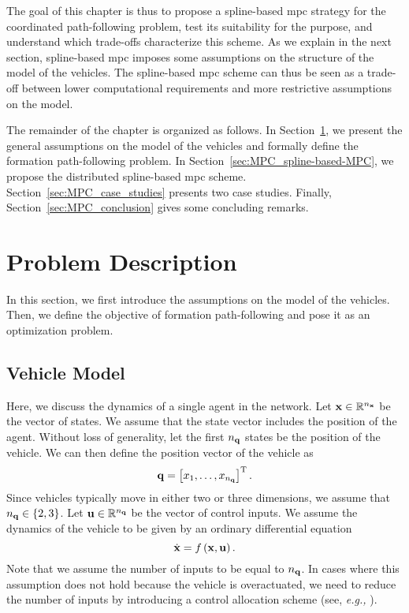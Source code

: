The goal of this chapter is thus to propose a spline-based \gls{mpc} strategy for the coordinated path-following problem, test its suitability for the purpose, and understand which trade-offs characterize this scheme. As we explain in the next section, spline-based \gls{mpc} imposes some assumptions on the structure of the model of the vehicles.    
The spline-based \gls{mpc} scheme can thus be seen as a trade-off between lower computational requirements and more restrictive assumptions on the model.

The remainder of the chapter is organized as follows.
In Section~\ref{sec:MPC_problem-description}, we present the general assumptions on the model of the vehicles and formally define the formation path-following problem.
In Section~\ref{sec:MPC_spline-based-MPC}, we propose the distributed spline-based \gls{mpc} scheme.
Section~\ref{sec:MPC_case_studies} presents two case studies.
Finally, Section~\ref{sec:MPC_conclusion} gives some concluding remarks.

\section{Problem Description}
\label{sec:MPC_problem-description}

In this section, we first introduce the assumptions on the model of the vehicles.
Then, we define the objective of formation path-following and pose it as an optimization problem.



\subsection{Vehicle Model}
\label{ssec:MPC_vehicle-model}



Here, we discuss the dynamics of a single agent in the network. Let $\mathbf{x} \in \mathbb{R}^{n_{\mathbf{x}}}$ be the vector of states.
We assume that the state vector includes the position of the agent.
Without loss of generality, let the first $n_{\mathbf{q}}$ states be the position of the vehicle.
We can then define the position vector of the vehicle as
\begin{equation}
    \mathbf{q} = \left[x_1, \ldots, x_{n_{\mathbf{q}}}\right]^{\mathrm{T}}.
\end{equation}
Since vehicles typically move in either two or three dimensions, we assume that $n_{\mathbf{q}} \in \left\{2,3\right\}$.
Let $\mathbf{u} \in \mathbb{R}^{n_{\mathbf{q}}}$ be the vector of control inputs.
We assume the dynamics of the vehicle to be given by an ordinary differential equation
\begin{equation}
    \dot{\mathbf{x}} = f \left(\mathbf{x}, \mathbf{u}\right).
\label{equ:MPC_dynamics-of-an-agent}
\end{equation}
Note that we assume the number of inputs to be equal to $n_{\mathbf{q}}$.
In cases where this assumption does not hold because the vehicle is overactuated, we need to reduce the number of inputs by introducing a control allocation scheme (see, \emph{e.g.,} \cite{johansen_control_2013}).

